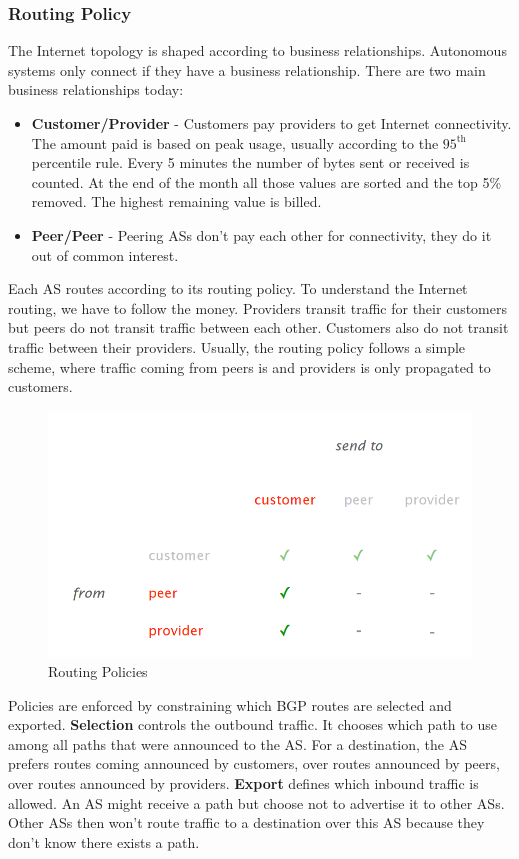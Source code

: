 \subsubsection{Routing Policy}
The Internet topology is shaped according to business relationships. Autonomous systems only connect if they have a business relationship. There are two main business relationships today:
\begin{itemize}
\item \textbf{Customer/Provider} - Customers pay providers to get Internet connectivity. The amount paid is based on peak usage, usually according to the $95^{\text{th}}$ percentile rule. Every 5 minutes the number of bytes sent or received is counted. At the end of the month all those values are sorted and the top 5\% removed. The highest remaining value is billed.
\item \textbf{Peer/Peer} - Peering ASs don't pay each other for connectivity, they do it out of common interest. 
\end{itemize}
Each AS routes according to its routing policy. To understand the Internet routing, we have to follow the money. Providers transit traffic for their customers but peers do not transit traffic between each other. Customers also do not transit traffic between their providers. Usually, the routing policy follows a simple scheme, where traffic coming from peers is and providers is only propagated to customers.
\begin{figure}[H]
\centering
\includegraphics[width=.7\textwidth]{images/policies.PNG}
\caption{Routing Policies}
\label{policies}
\end{figure}
Policies are enforced by constraining which BGP routes are selected and exported. \textbf{Selection} controls the outbound traffic. It chooses which path to use among all paths that were announced to the AS. For a destination, the AS prefers routes coming announced by customers, over routes announced by peers, over routes announced by providers. \textbf{Export} defines which inbound traffic is allowed. An AS might receive a path but choose not to advertise it to other ASs. Other ASs then won't route traffic to a destination over this AS because they don't know there exists a path. \vspace{.3cm}\\

